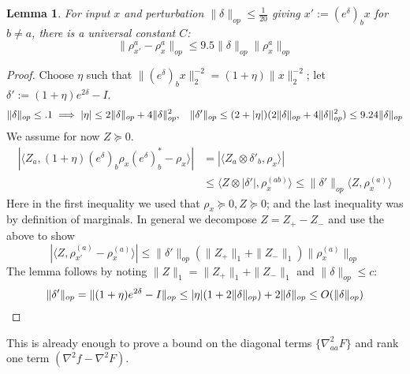 \documentclass{article}
\newtheorem{lemma}[theorem]{Lemma}
\newcommand\samp{x}
\newcommand{\CF}[1]{{\color{purple}[CF: #1]}}
\newcommand{\AR}[1]{{\color{orange}[AR: #1]}}
\begin{document}
\begin{lemma} \label{btoaaRobustness}
For input $\samp$ and perturbation $\|\delta\|_{op} \leq \frac{1}{20}$ giving $\samp' := (e^{\delta})_{b} \samp$ for $b \neq a$, there is a universal constant $C$:
\[ \|\rho_{\samp'}^{a} - \rho_{\samp}^{a}\|_{op} \leq 9.5 \|\delta\|_{op} \|\rho_{\samp}^{a}\|_{op}      \]
\end{lemma}
\begin{proof} 
Choose $\eta$ such that $\|(e^{\delta})_{b} \samp\|_{2}^{-2} = (1+\eta) \|\samp\|_{2}^{-2}$; let $\delta' := (1+\eta)e^{2\delta} - I$. 
\[ \|\delta\|_{op} \leq .1 \implies |\eta| \leq 2\|\delta\|_{op} + 4\|\delta\|_{op}^{2}, \hspace{3mm} \|\delta'\|_{op} \leq (2+|\eta|)(2\|\delta\|_{op} + 4\|\delta\|_{op}^{2}) \leq 9.24 \|\delta\|_{op} \]
We assume for now $Z \succeq 0$. 
\begin{align*} | \langle Z_{a}, (1+\eta) (e^{\delta})_{b} \rho_{\samp} (e^{\delta})_{b}^{*} - \rho_{\samp} \rangle| 
& = | \langle Z_{a} \otimes \delta'_{b}, \rho_{\samp} \rangle   |  \\ 
&\leq \langle Z \otimes |\delta'|, \rho_{\samp}^{(ab)} \rangle   
\leq \|\delta'\|_{op} \langle Z, \rho_{\samp}^{(a)} \rangle    
\end{align*}
Here in the first inequality we used that $\rho_{\samp} \succeq 0, Z \succeq 0$; and the last inequality was by definition of marginals. 
In general we decompose $Z = Z_{+} - Z_{-}$ and use the above to show
\[ |\langle Z, \rho_{\samp'}^{(a)} - \rho_{\samp}^{(a)} \rangle| \leq \|\delta'\|_{op} (\|Z_{+}\|_{1} + \|Z_{-}\|_{1}) \|\rho_{\samp}^{(a)}\|_{op}     \]
The lemma follows by noting $\|Z\|_{1} = \|Z_{+}\|_{1} + \|Z_{-}\|_{1}$ and $\|\delta\|_{op} \leq c$:
\[ \|\delta'\|_{op} = \|(1+\eta) e^{2 \delta} - I\|_{op} \leq |\eta|(1 + 2 \|\delta\|_{op}) + 2\|\delta\|_{op} \leq O(\|\delta\|_{op})   \qedhere  \]
\end{proof}

This is already enough to prove a bound on the diagonal terms $\{\nabla^{2}_{aa} F\}$ and rank one term $(\nabla^{2} f - \nabla^{2} F)$. 
\end{document}
